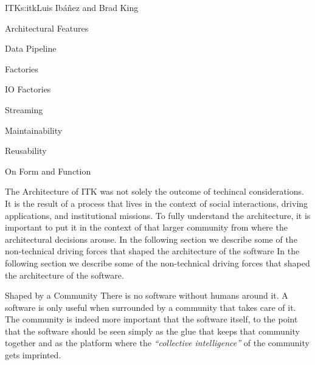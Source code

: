 \begin{aosachapter}{ITK}{s:itk}{Luis Ib\'{a}\~{n}ez and Brad King}
\begin{aosasect1}{Architectural Features}
\begin{aosasect2}{Data Pipeline}

\end{aosasect2}

\begin{aosasect2}{Factories}
\end{aosasect2}

\begin{aosasect2}{IO Factories}


\end{aosasect2}

\begin{aosasect2}{Streaming}
\end{aosasect2}

\begin{aosasect2}{Maintainability}
\end{aosasect2}

\begin{aosasect2}{Reusability}
\end{aosasect2}

\end{aosasect1}

\begin{aosasect1}{On Form and Function}

The Architecture of ITK was not solely the outcome of techincal
considerations. It is the result of a process that lives in the
context of social interactions, driving applications, and
institutional missions. To fully understand the architecture, it is
important to put it in the context of that larger community from where
the architectural decisions arouse. In the following section we
describe some of the non-technical driving forces that shaped the
architecture of the software In the following section we describe some
of the non-technical driving forces that shaped the architecture of
the software.

\begin{aosasect2}{Shaped by a Community}
There is no software without humans around it. A software is only
useful when surrounded by a community that takes care of it. The
community is indeed more important that the software itself, to the
point that the software should be seen simply as the glue that keeps
that community together and as the platform where the \emph{``collective
intelligence''} of the community gets imprinted.
\end{aosasect2}


\end{aosasect1}
\end{aosachapter}
